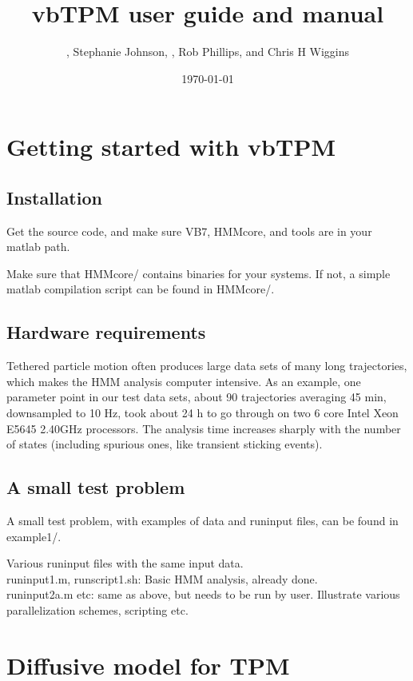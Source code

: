 \documentclass[11pt,letterpaper,twocolumn]{article}
\title{vbTPM user guide and manual}
\author{\ml{Martin Lind\'en}, Stephanie Johnson, \jwm{Jan-Willem van
    de Meent}, Rob Phillips, and Chris H Wiggins}
\date{\today}
\begin{document}
\maketitle
\tableofcontents

\section{Getting started with vbTPM}
\subsection{Installation}
Get the source code, and make sure VB7, HMMcore, and tools are in your
matlab path.

Make sure that HMMcore/ contains binaries for your systems. If not, a
simple matlab compilation script can be found in HMMcore/.

\subsection{Hardware requirements}
Tethered particle motion often produces large data sets of many long
trajectories, which makes the HMM analysis computer intensive. As an
example, one parameter point in our test data sets, about 90
trajectories averaging 45 min, downsampled to 10 Hz, took about 24 h
to go through on two 6 core Intel Xeon E5645 2.40GHz processors. The
analysis time increases sharply with the number of states (including
spurious ones, like transient sticking events).
\subsection{A small test problem}
A small test problem, with examples of data and runinput files, can be
found in example1/.

Various runinput files with the same input data.\\ 

runinput1.m, runscript1.sh: Basic HMM analysis, already done.\\

runinput2a.m etc: same as above, but needs to be run by
user. Illustrate various parallelization schemes, scripting etc.


\section{Diffusive model for TPM}

\end{document}
